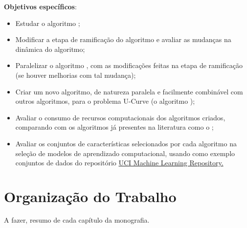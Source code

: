 {\bf Objetivos específicos}:
\begin{itemize}
\item{Estudar o algoritmo ;}
\item{Modificar a etapa de ramificação do algoritmo  e avaliar
as mudanças na dinâmica do algoritmo;}
\item{Paralelizar o algoritmo , com as modificações feitas
na etapa de ramificação (se houver melhorias com tal mudança);}
\item{Criar um novo algoritmo, de natureza paralela e facilmente combinável com outros algoritmos, para o problema 
U-Curve (o algoritmo );}
\item{Avaliar o consumo de recursos computacionais dos algoritmos 
criados, comparando com os algoritmos já presentes na literatura como
o ;}
\item{Avaliar os conjuntos de características selecionados por cada 
algoritmo na seleção de modelos de aprendizado computacional, usando 
como exemplo conjuntos de dados do repositório \href{https://archive.ics.uci.edu/ml/index.php}{UCI Machine Learning 
Repository.}}
\end{itemize}

\section{Organização do Trabalho}

A fazer, resumo de cada capítulo da monografia.

